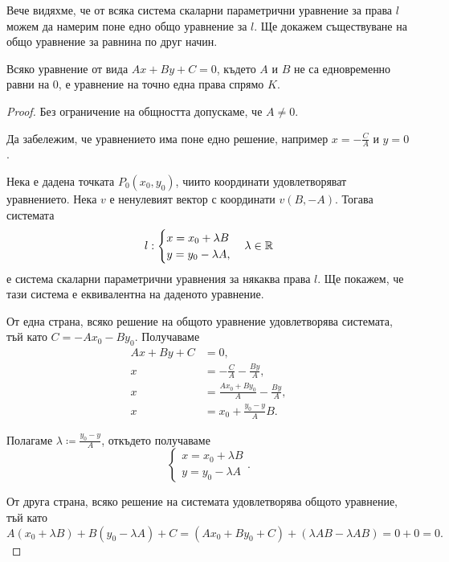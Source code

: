 \documentclass[numbers=endperiod, DIV=15, bibliography=totocnumbered]{scrartcl}
\begin{document}
Вече видяхме, че от всяка система скаларни параметрични уравнение за права $l$ можем да намерим поне едно общо уравнение за $l$. Ще докажем съществуване на общо уравнение за равнина по друг начин.

\begin{proposition}
  Всяко уравнение от вида $Ax + By + C = 0$, където $A$ и $B$ не са едновременно равни на $0$, е уравнение на точно една права спрямо $K$.
\end{proposition}
\begin{proof}
  Без ограничение на общността допускаме, че $A \neq 0$.

  Да забележим, че уравнението има поне едно решение, например $x = -\frac C A$ и $y = 0$.

  Нека е дадена точката $P_0(x_0, y_0)$, чиито координати удовлетворяват уравнението. Нека $v$ е ненулевият вектор с координати $v(B, -A)$. Тогава системата
  \begin{align*}
    l: \begin{cases}
      x = x_0 + \lambda B \\
      y = y_0 - \lambda A,
    \end{cases}
    \lambda \in \mathbb{R}
  \end{align*}
  е система скаларни параметрични уравнения за някаква права $l$. Ще покажем, че тази система е еквивалентна на даденото уравнение.

  От една страна, всяко решение на общото уравнение удовлетворява системата, тъй като $C = -Ax_0 - By_0$. Получаваме
  \begin{align*}
    Ax + By + C &= 0, \\
    x &= -\frac C A -\frac {By} A, \\
    x &= \frac {Ax_0 + By_0} A -\frac {By} A, \\
    x &= x_0 + \frac {y_0 - y} A B.
  \end{align*}

  Полагаме $\lambda \coloneqq \frac{y_0 - y} A$, откъдето получаваме
  \begin{displaymath}
    \begin{cases}
      x = x_0 + \lambda B \\
      y = y_0 - \lambda A
    \end{cases}.
  \end{displaymath}

  От друга страна, всяко решение на системата удовлетворява общото уравнение, тъй като
  \begin{displaymath}
    A (x_0 + \lambda B) + B (y_0 - \lambda A) + C
    =
    (A x_0 + B y_0 + C) + (\lambda AB - \lambda AB)
    =
    0 + 0 = 0.
  \end{displaymath}
\end{proof}
\end{document}
